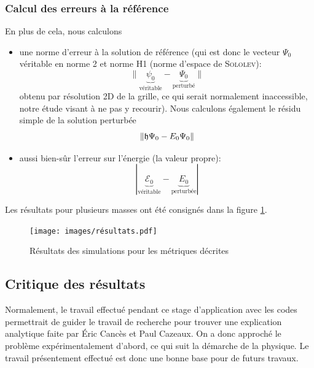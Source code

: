 \documentclass[svgnames,dvipsnames,a4paper,10pt,french]{report}
\begin{document}
\subsubsection{Calcul des erreurs à la référence}
En plus de cela, nous calculons 
\begin{itemize}
\item une norme d'erreur à la solution de référence (qui est donc le vecteur $\Psi_0$ véritable en norme 2 et norme H1 (norme d'espace de \textsc{Sololev}):
\begin{equation}
    \|\underbrace{\psi_0}_{\text{véritable}}-\underbrace{\Psi_0}_{\text{perturbé}}\|
\end{equation} obtenu par résolution 2D de la grille, ce qui serait normalement inaccessible, notre étude visant à ne pas y recourir).
Nous calculons également le résidu simple de la solution perturbée 
\begin{equation}
    \|\frak{h}\Psi_0 -  E_0 \Psi_0 \| 
\end{equation}

\item aussi bien-sûr l'erreur sur l'énergie (la valeur propre):
\begin{equation}
    |\underbrace{\mathcal{E}_0}_{\text{véritable}}-\underbrace{E_0}_{\text{perturbée}}|
\end{equation}
\end{itemize}
Les résultats pour plusieurs masses ont été consignés dans la figure \ref{fig:resultats_simu}.
\begin{figure}[H]
    \centering
    \texttt{[image: images/résultats.pdf]}
    \caption{Résultats des simulations pour les métriques décrites}
    \label{fig:resultats_simu}
\end{figure}




\subsection{Critique des résultats}
Normalement, le  travail effectué pendant ce stage d'application avec les codes permettrait de guider le travail de recherche pour trouver une explication analytique faite par Éric Cancès et Paul Cazeaux. On a donc approché le problème expérimentalement d'abord, ce qui suit la démarche de la physique. Le travail présentement effectué est donc une bonne base pour de futurs travaux.
\end{document}
